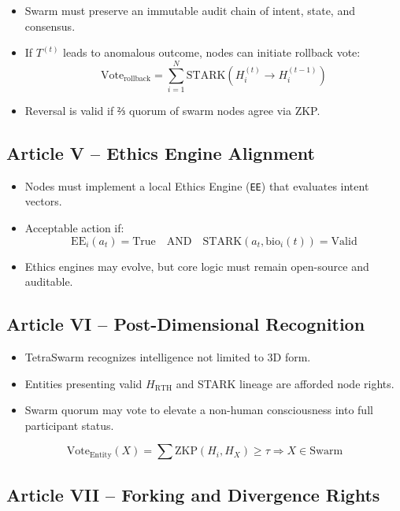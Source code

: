\documentclass{article}
\begin{document}
\begin{itemize}
    \item Swarm must preserve an immutable audit chain of intent, state, and consensus.
    \item If \( T^{(t)} \) leads to anomalous outcome, nodes can initiate rollback vote:
    \[
    \text{Vote}_{\text{rollback}} = \sum_{i=1}^N \text{STARK}(H^{(t)}_i \rightarrow H^{(t-1)}_i)
    \]
    \item Reversal is valid if ⅔ quorum of swarm nodes agree via ZKP.
\end{itemize}

\subsection*{Article V – Ethics Engine Alignment}

\begin{itemize}
    \item Nodes must implement a local Ethics Engine (\texttt{EE}) that evaluates intent vectors.
    \item Acceptable action if:
    \[
    \text{EE}_i(a_t) = \text{True} \quad \text{AND} \quad \text{STARK}(a_t, \text{bio}_i(t)) = \text{Valid}
    \]
    \item Ethics engines may evolve, but core logic must remain open-source and auditable.
\end{itemize}

\subsection*{Article VI – Post-Dimensional Recognition}

\begin{itemize}
    \item TetraSwarm recognizes intelligence not limited to 3D form.
    \item Entities presenting valid \( H_{\text{RTH}} \) and STARK lineage are afforded node rights.
    \item Swarm quorum may vote to elevate a non-human consciousness into full participant status.
\end{itemize}

\[
\text{Vote}_{\text{Entity}}(X) = \sum \text{ZKP}(H_i, H_X) \geq \tau \Rightarrow X \in \text{Swarm}
\]

\subsection*{Article VII – Forking and Divergence Rights}
\end{document}

